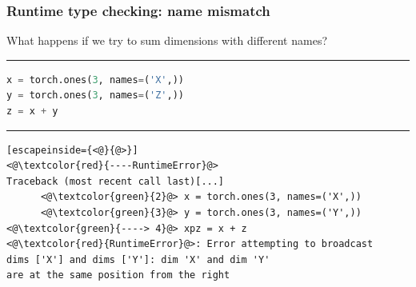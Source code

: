 \documentclass{beamer}
\begin{document}
    \begin{frame}[fragile]
        \frametitle{Runtime type checking: name mismatch}

        What happens if we try to sum dimensions with different names?

        \noindent\rule{\textwidth}{0.5pt}

        \begin{lstlisting}[language=Python]
x = torch.ones(3, names=('X',))
y = torch.ones(3, names=('Z',))
z = x + y
        \end{lstlisting}
        \noindent\rule{\textwidth}{0.5pt}
        \begin{lstlisting}[escapeinside={<@}{@>}]
<@\textcolor{red}{----RuntimeError}@>
Traceback (most recent call last)[...]
      <@\textcolor{green}{2}@> x = torch.ones(3, names=('X',))
      <@\textcolor{green}{3}@> y = torch.ones(3, names=('Y',))
<@\textcolor{green}{----> 4}@> xpz = x + z
<@\textcolor{red}{RuntimeError}@>: Error attempting to broadcast
dims ['X'] and dims ['Y']: dim 'X' and dim 'Y'
are at the same position from the right
        \end{lstlisting}
    \end{frame}
\end{document}
